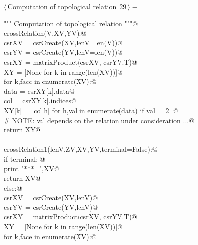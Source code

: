 \documentclass[11pt,oneside]{article}	%
\begin{document}
\begin{flushleft} \small \label{scrap47}
\protect{}$\langle\,$Computation of topological relation\nobreak\ {\footnotesize 29}$\,\rangle\equiv$
\vspace{-1ex}
\begin{list}{}{} \item
\mbox{}\verb@""" Computation of topological relation """@\\
\mbox{}\verb@def crossRelation(V,XV,YV):@\\
\mbox{}\verb@    csrXV = csrCreate(XV,lenV=len(V))@\\
\mbox{}\verb@    csrYV = csrCreate(YV,lenV=len(V))@\\
\mbox{}\verb@    csrXY = matrixProduct(csrXV, csrYV.T)@\\
\mbox{}\verb@    XY = [None for k in range(len(XV))]@\\
\mbox{}\verb@    for k,face in enumerate(XV):@\\
\mbox{}\verb@        data = csrXY[k].data@\\
\mbox{}\verb@        col = csrXY[k].indices@\\
\mbox{}\verb@        XY[k] = [col[h] for h,val in enumerate(data) if val==2] @\\
\mbox{}\verb@        # NOTE: val depends on the relation under consideration ...@\\
\mbox{}\verb@    return XY@\\
\mbox{}\verb@@\\
\mbox{}\verb@def crossRelation1(lenV,ZV,XV,YV,terminal=False):@\\
\mbox{}\verb@    if terminal:  @\\
\mbox{}\verb@        print "\n****\nXV =",XV@\\
\mbox{}\verb@        return XV@\\
\mbox{}\verb@    else:@\\
\mbox{}\verb@        csrXV = csrCreate(XV,lenV)@\\
\mbox{}\verb@        csrYV = csrCreate(YV,lenV)@\\
\mbox{}\verb@        csrXY = matrixProduct(csrXV, csrYV.T)@\\
\mbox{}\verb@        XY = [None for k in range(len(XV))]@\\
\mbox{}\verb@        for k,face in enumerate(XV):@\\

\end{list}
\end{flushleft}
\end{document}
